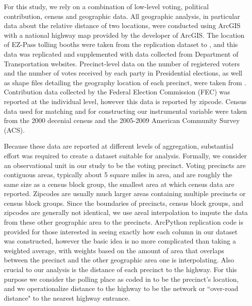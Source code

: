 For this study, we rely on a combination of low-level voting, political contribution, census and geographic data. All geographic analysis, in particular data about the relative distance of two locations, were conducted using ArcGIS with a national highway map provided by the developer of ArcGIS. The location of EZ-Pass tolling booths were taken from the replication dataset to \textcite{Currie2011}, and this data was replicated and supplemented with data collected from Department of Transportation websites. Precinct-level data on the number of registered voters and the number of votes received by each party in Presidential elections, as well as shape files detailing the geography location of each precinct, were taken from \textcite{Ansolabehere2014}. Contribution data collected by the Federal Election Commission (FEC) was reported at the individual level, however this data is reported by zipcode. Census data used for matching and for constructing our instrumental variable were taken from the 2000 decenial census and the 2005-2009 American Community Survey (ACS).

Because these data are reported at different levels of aggregation, substantial effort was required to create a dataset suitable for analysis. Formally, we consider an observational unit in our study to be the voting precinct. Voting precincts are contiguous areas, typically about 5 square miles in area, and are roughly the same size as a census block group, the smallest area at which census data are reported. Zipcodes are usually much larger areas containing multiple precincts or census block groups. Since the boundaries of precincts, census block groups, and zipcodes are generally not identical, we use areal interpolation to impute the data from these other geographic area to the precincts. ArcPython replication code is provided for those interested in seeing exactly how each column in our dataset was constructed, however the basic idea is no more complicated than taking a weighted average, with weights based on the amount of area that overlaps between the precinct and the other geographic area one is interpolating. Also crucial to our analysis is the distance of each precinct to the highway. For this purpose we consider the polling place as coded in \textcite{Ansolabehere2014} to be the precinct's location, and we operationalize distance to the highway to be the network or ``over-road distance" to the nearest highway entrance.  